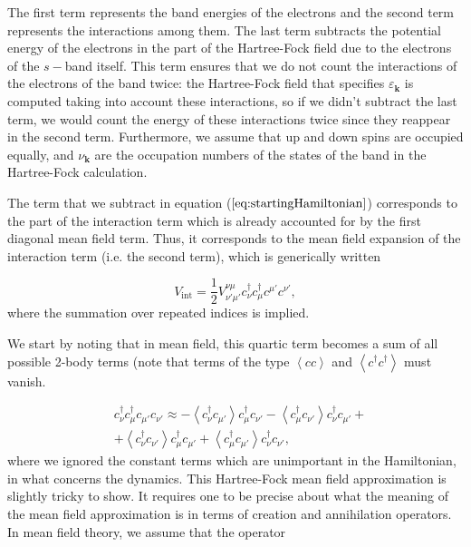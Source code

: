 \documentclass[10pt, twocolumn, twoside]{article}
\begin{document}
The first term represents the band energies of the electrons and the second term represents the interactions among them. The last term subtracts the potential energy of the electrons in the part of the Hartree-Fock field due to the electrons of the $s-$band itself. This term ensures that we do not count the interactions of the electrons of the band twice: the Hartree-Fock field that specifies $\varepsilon_{\bm k}$ is computed taking into account these interactions, so if we didn't subtract the last term, we would count the energy of these interactions twice since they reappear in the second term. Furthermore, we assume that up and down spins are occupied equally, and $\nu_{\bm k}$ are the occupation numbers of the states of the band in the Hartree-Fock calculation. 

The term that we subtract in equation ($\ref{eq:startingHamiltonian}$) corresponds to the part of the interaction term which is already accounted for by the first diagonal mean field term. Thus, it corresponds to the mean field expansion of the interaction term (i.e. the second term), which is generically written

\begin{equation}
V_{\text{int}} = \frac{1}{2} V^{\nu\mu}_{\nu'\mu'} c_\nu^\dagger c_\mu^\dagger c^{\mu'} c^{\nu'} ,
\end{equation}
where the summation over repeated indices is implied.

We start by noting that in mean field, this quartic term becomes a sum of all possible 2-body terms (note that terms of the type $\left\langle cc \right\rangle$ and $\left\langle c^\dagger c^\dagger \right\rangle$ must vanish.

\begin{equation}\label{eq:c_mft}
\begin{split}
&c_\nu^\dagger c_\mu^\dagger c_{\mu'} c_{\nu'} \approx - \left\langle c_\nu^\dagger c_{\mu'} \right\rangle  c_{\mu}^\dagger c_{\nu'} - \left\langle c_{\mu}^\dagger c_{\nu'} \right\rangle c_{\nu}^\dagger c_{\mu'} + \\
&+ \left\langle c_{\nu}^\dagger c_{\nu'} \right\rangle  c_{\mu}^\dagger c_{\mu'} + \left\langle c_{\mu}^\dagger c_{\mu'} \right\rangle  c_{\nu}^\dagger c_{\nu'} ,
\end{split}
\end{equation}
where we ignored the constant terms which are unimportant in the Hamiltonian, in what concerns the dynamics. This Hartree-Fock mean field approximation is slightly tricky to show. It requires one to be precise about what the meaning of the mean field approximation is in terms of creation and annihilation operators. In mean field theory, we assume that the operator
\end{document}
